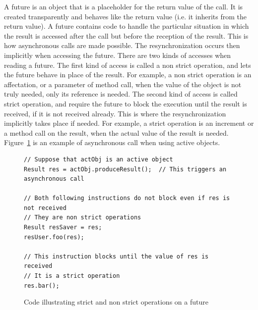 \documentclass[11pt]{report}
\begin{document}
A future is an object that is a placeholder for the return value of the call. It is created transparently and behaves like the return value (i.e. it inherits from the return value). A future contains code to handle the particular situation in which the result is accessed after the call but before the reception of the result. This is how asynchronous calls are made possible.
The resynchronization occurs then implicitly when accessing the future. There are two kinds of accesses when reading a future. The first kind of access is called a non strict operation, and lets the future behave in place of the result. For example, a non strict operation is an affectation, or a parameter of method call, when the value of the object is not truly needed, only its reference is needed. The second kind of access is called strict operation, and require the future to block the execution until the result is received, if it is not received already. This is where the resynchronization implicitly takes place if needed. For example, a strict operation is an increment or a method call on the result, when the actual value of the result is needed.
Figure~\ref{fig:strict_operation} is an example of asynchronous call when using active objects.

\begin{figure}[!ht]
	\lstset{language=java, numbers=left, numberstyle=\tiny, stepnumber=1, numbersep=5pt, basicstyle=\footnotesize}
	\begin{lstlisting}[frame=single]
// Suppose that actObj is an active object
Result res = actObj.produceResult();  // This triggers an asynchronous call

// Both following instructions do not block even if res is not received
// They are non strict operations
Result resSaver = res;
resUser.foo(res);

// This instruction blocks until the value of res is received 
// It is a strict operation
res.bar();
 	\end{lstlisting}
\caption{Code illustrating strict and non strict operations on a future}
\label{fig:strict_operation}
\end{figure}
\end{document}
